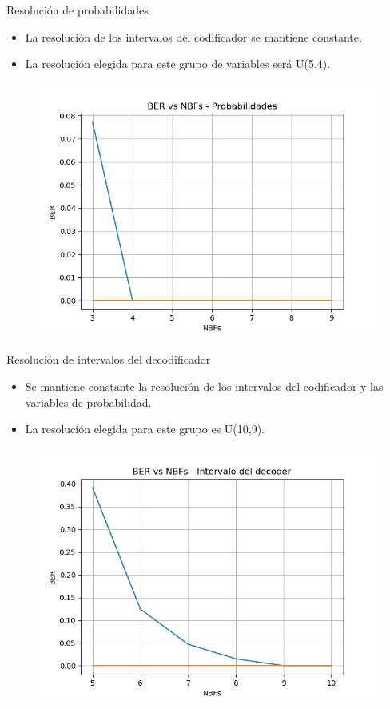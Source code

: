\documentclass[xcolor=table]{beamer}
\begin{document}
\begin{frame}{Resolución de probabilidades}
\begin{itemize}
    \item  La resolución de los intervalos del codificador se mantiene constante.
    \item  La resolución elegida para este grupo de variables será U(5,4).
    \end{itemize}
    \begin{figure}
  \centering
  \includegraphics[width=0.60\paperwidth]{Graficos/cuantization2.png}%
\end{figure}
\end{frame}

\begin{frame}{Resolución de intervalos del decodificador}
\begin{itemize}
    \item Se mantiene constante la resolución de los intervalos del codificador y las variables de probabilidad.
    \item La resolución elegida para este grupo es U(10,9).
    \end{itemize}
    \begin{figure}
  \centering
  \includegraphics[width=0.60\paperwidth]{Graficos/cuantization3.png}%
\end{figure}
\end{frame}
\end{document}
